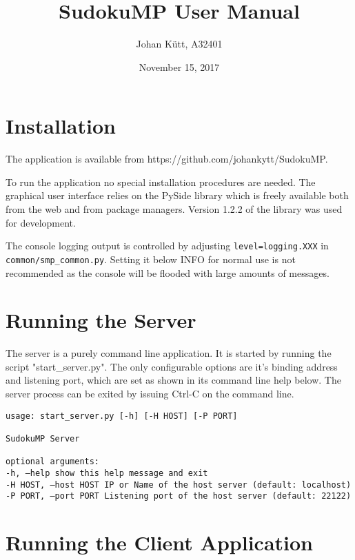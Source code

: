 \documentclass[a4paper]{article}
\title{SudokuMP User Manual}
\author{Johan Kütt, A32401}
\date{November 15, 2017}
\begin{document}
\maketitle

\section{Installation}

The application is available from https://github.com/johankytt/SudokuMP.

To run the application no special installation procedures are needed. The graphical user interface relies on the PySide library which is freely available both from the web and from package managers. Version 1.2.2 of the library was used for development.

The console logging output is controlled by adjusting \texttt{level=logging.XXX} in \texttt{common/smp\_common.py}. Setting it below INFO for normal use is not recommended as the console will be flooded with large amounts of messages.


\section{Running the Server}

The server is a purely command line application. It is started by running the script "start\_server.py". The only configurable options are it's binding address and listening port, which are set as shown in its command line help below. The server process can be exited by issuing Ctrl-C on the command line.

\hrulefill

\texttt{usage: start\_server.py [-h] [-H HOST] [-P PORT]\\
~\\
SudokuMP Server\\
~\\
optional arguments:\\
-h, --help            show this help message and exit\\
-H HOST, --host HOST  IP or Name of the host server (default: localhost)\\
-P PORT, --port PORT  Listening port of the host server (default: 22122)
}

\hrulefill


\section{Running the Client Application}
\end{document}

